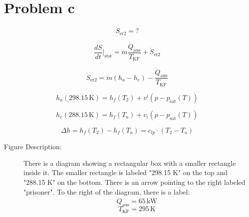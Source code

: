 \section*{Problem c}

\[
\dot{S}_{\text{er2}} = ?
\]

\[
\frac{dS}{dt} \bigg|_{\text{stst}} = \dot{m} \frac{\dot{Q}_{\text{aus}}}{T_{\text{KF}}} + \dot{S}_{\text{er2}}
\]

\[
\dot{S}_{\text{er2}} = \dot{m} (h_a - h_e) - \frac{\dot{Q}_{\text{aus}}}{T_{\text{KF}}}
\]

\[
h_a (298.15 \, \text{K}) = h_f (T_2) + v^i (p - p_{\text{sat}} (T))
\]

\[
h_e (288.15 \, \text{K}) = h_f (T_a) + v_i (p - p_{\text{sat}} (T))
\]

\[
\Delta h = h_f (T_2) - h_f (T_a) = c_{lp} \cdot (T_2 - T_a)
\]

\begin{description}
\item[Figure Description:] 
There is a diagram showing a rectangular box with a smaller rectangle inside it. The smaller rectangle is labeled "298.15 K" on the top and "288.15 K" on the bottom. There is an arrow pointing to the right labeled "prisoner". To the right of the diagram, there is a label: 
\[
\dot{Q}_{\text{aus}} = 65 \, \text{kW}
\]
\[
T_{\text{KF}} = 295 \, \text{K}
\]
\end{description}